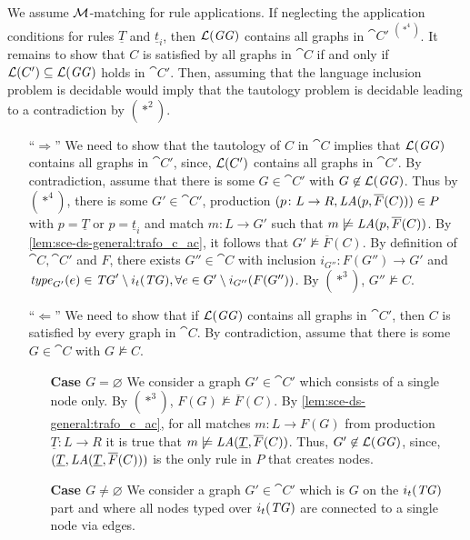 We assume ${\cal M}$-matching for rule applications.
If neglecting the application conditions for rules $\underline{T}$ and $\underline{t}_i$, then $\mathcal{L}(\mathit{GG})$ contains all graphs in $\cat{C'}$ $^{(*^4)}$.
It remains to show that $C$ is satisfied by all graphs in $\cat{C}$ if and only if $\mathcal{L}(C') \subseteq \mathcal{L}(\mathit{GG})$ holds in $\cat{C'}$.
Then, assuming that the language inclusion problem is decidable would imply that the tautology problem is decidable leading to a contradiction by $(*^2)$.
\begin{itemize}
  \item[``$\Rightarrow$''] We need to show that the tautology of $C$ in $\cat{C}$ implies that $\mathcal{L}(\mathit{GG})$ contains all graphs in $\cat{C'}$, since, $\mathcal{L}(C')$ contains all graphs in $\cat{C'}$.
  By contradiction, assume that there is some $G \in \cat{C'}$ with $G \not\in \mathcal{L}(\mathit{GG})$.
  Thus by $(*^4)$, there is some $G' \in \cat{C'}$, production $(p\colon L \to R,\mathit{LA}(p,\overline{F}(C)))\in P$ with $p=\underline{T}$ or $p=\underline{t}_i$ and match $m\colon L \to G'$ such that $m \not\models \mathit{LA}(p,\overline{F}(C))$.
  By \cref{lem:sce-ds-general:trafo_c_ac}, it follows that $G' \not\models \overline{F}(C)$.
  By definition of $\cat{C},\cat{C'}$ and $F$, there exists $G'' \in \cat{C}$ with inclusion $i_{G''}\colon F(G'') \to G'$ and $\mathit{type}_{G'}(e) \in \mathit{TG}'\setminus i_t(\mathit{TG}),\forall e \in G'\setminus i_{G''}(F(G''))$.
  By $(*^3)$, $G'' \not\models C$.
  \item[``$\Leftarrow$''] We need to show that if $\mathcal{L}(\mathit{GG})$ contains all graphs in $\cat{C'}$, then $C$ is satisfied by every graph in $\cat{C}$.
  By contradiction, assume that there is some $G \in \cat{C}$ with $G \not\models C$.
  \begin{enumerate}
    \item[\textbf{Case $G=\varnothing$}] We consider a graph $G' \in \cat{C'}$ which consists of a single  node only.
    By $(*^3)$, $F(G)\not\models \overline{F}(C)$.
    By \cref{lem:sce-ds-general:trafo_c_ac}, for all matches $m\colon L \to F(G)$ from production $\underline{T}\colon L \to R$ it is true that $m \not\models \mathit{LA}(\underline{T},\overline{F}(C))$.
    Thus, $G' \not\in \mathcal{L}(\mathit{GG})$, since, $(\underline{T},\mathit{LA}(\underline{T},\overline{F}(C)))$ is the only rule in $P$ that creates  nodes.
    \item[\textbf{Case $G\neq\varnothing$}] We consider a graph $G' \in \cat{C'}$ which is $G$ on the $i_t(\mathit{TG})$ part and where all nodes  typed over $i_t(\mathit{TG})$ are connected to a single  node via  edges.

\end{enumerate}
\end{itemize}
